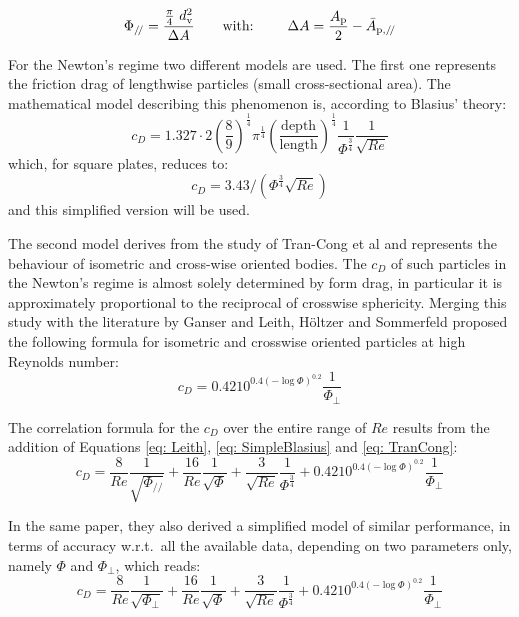 		\begin{equation}
			\Phi_{/\!/} = \dfrac{\frac{\pi}{4}\ \dv^2} {\Delta A} \qquad \text{with: } \qquad \Delta A = \dfrac{A_{\textup{p}}}{2} - \bar{A}_{\textup{p},/\!/}
			\label{eq: Lengthwise}
		\end{equation}

		For the Newton's regime two different models are used. The first one represents the friction drag of lengthwise particles (small cross-sectional area). The mathematical model describing this phenomenon is, according to Blasius' theory:
		\begin{equation}
			c_D = 1.327 \cdot 2 \left(\frac{8}{9}\right)^{\frac{1}{4}} \pi^{\frac{1}{4}} \left(\frac{\text{depth}}{\text{length}}\right)^{\frac{1}{4}} \frac{1}{\Phi^{\frac{3}{4}}} \frac{1}{\sqrt{Re}}
			\label{eq: Blasius}
		\end{equation}
		which, for square plates, reduces to:
		\begin{equation}
			c_D = 3.43 / (\Phi^{\frac{3}{4}} \sqrt{Re})
			\label{eq: SimpleBlasius}
		\end{equation}
		and this simplified version will be used.
		
		The second model derives from the study of Tran-Cong et al \cite{TranCongEtAl-2004} and represents the behaviour of isometric and cross-wise oriented bodies. The $ c_D $ of such particles in the Newton's regime is almost solely determined by form drag, in particular it is approximately proportional to the reciprocal of crosswise sphericity. Merging this study with the literature by Ganser and Leith, H\"{o}ltzer and Sommerfeld proposed the following formula for isometric and crosswise oriented particles at high Reynolds number:
		\begin{equation}
			c_D = 0.4210^{0.4(-\log \Phi)^{0.2}} \frac{1}{\Phi_{\perp}}
			\label{eq: TranCong}
		\end{equation}

		The correlation formula for the $ c_D $ over the entire range of $ Re  $ results from the addition of Equations \ref{eq: Leith}, \ref{eq: SimpleBlasius} and \ref{eq: TranCong}:
		\begin{equation}
			c_D = \frac{8}{Re} \frac{1}{\sqrt{\Phi_{/\!/}}} 
			    + \frac{16}{Re} \frac{1}{\sqrt{\Phi}} 
			    + \frac{3}{\sqrt{Re}} \frac{1}{\Phi^{\frac{3}{4}}} 
			    + 0.4210^{0.4(-\log \Phi)^{0.2}} \frac{1}{\Phi_{\perp}}
			\label{eq: HS}
		\end{equation}
	
		In the same paper, they also derived a simplified model of similar performance, in terms of accuracy w.r.t.\ all the available data, depending on two parameters only, namely $\Phi$ and $\Phi_{\perp}$, which reads:
		\begin{equation}
			c_D = \frac{8}{Re} \frac{1}{\sqrt{\Phi_{\perp}}} 
			    + \frac{16}{Re} \frac{1}{\sqrt{\Phi}} 
			    + \frac{3}{\sqrt{Re}} \frac{1}{\Phi^{\frac{3}{4}}} 
			    + 0.4210^{0.4(-\log \Phi)^{0.2}} \frac{1}{\Phi_{\perp}}
			\label{eq: SimpleHS}
		\end{equation}
		
